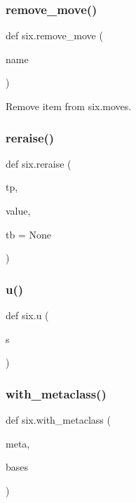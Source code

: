 \mbox{\label{namespacesix_a415a73f8f1dd244e895fb118878fb66d}} 
\subsubsection{\texorpdfstring{remove\+\_\+move()}{remove\_move()}}
{\footnotesize\ttfamily def six.\+remove\+\_\+move (\begin{DoxyParamCaption}\item[{}]{name }\end{DoxyParamCaption})}

\begin{DoxyVerb}Remove item from six.moves.\end{DoxyVerb}
 \mbox{\label{namespacesix_ae8a8e80e2dabc3c2bc2d8a582cfcc43d}} 
\subsubsection{\texorpdfstring{reraise()}{reraise()}}
{\footnotesize\ttfamily def six.\+reraise (\begin{DoxyParamCaption}\item[{}]{tp,  }\item[{}]{value,  }\item[{}]{tb = {\ttfamily None} }\end{DoxyParamCaption})}

\mbox{\label{namespacesix_a4704ba0ec352ed62913e25fe339c4029}} 
\subsubsection{\texorpdfstring{u()}{u()}}
{\footnotesize\ttfamily def six.\+u (\begin{DoxyParamCaption}\item[{}]{s }\end{DoxyParamCaption})}

\mbox{\label{namespacesix_af599400254a842b0a0fc5dab5bcbe8a4}} 
\subsubsection{\texorpdfstring{with\+\_\+metaclass()}{with\_metaclass()}}
{\footnotesize\ttfamily def six.\+with\+\_\+metaclass (\begin{DoxyParamCaption}\item[{}]{meta,  }\item[{}]{bases }\end{DoxyParamCaption})}

